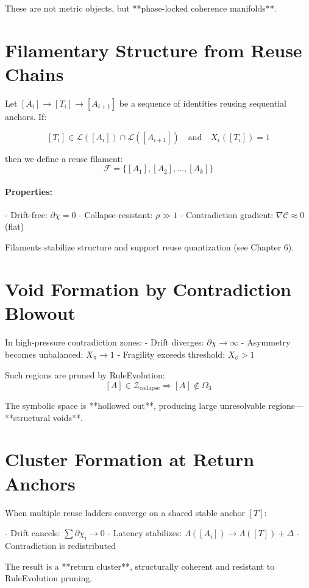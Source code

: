 These are not metric objects, but **phase-locked coherence manifolds**.

\section{Filamentary Structure from Reuse Chains}

Let $[A_i] \to [T_i] \to [A_{i+1}]$ be a sequence of identities reusing sequential anchors. If:

\[
[T_i] \in \mathcal{L}([A_i]) \cap \mathcal{L}([A_{i+1}])
\quad \text{and} \quad X_\epsilon([T_i]) = 1
\]

then we define a reuse filament:
\[
\mathcal{F} = \{[A_1], [A_2], \dots, [A_k]\}
\]

\paragraph{Properties:}
- Drift-free: $\partial \chi = 0$
- Collapse-resistant: $\rho \gg 1$
- Contradiction gradient: $\nabla \mathcal{C} \approx 0$ (flat)

Filaments stabilize structure and support reuse quantization (see Chapter 6).

\section{Void Formation by Contradiction Blowout}

In high-pressure contradiction zones:
- Drift diverges: $\partial \chi \to \infty$
- Asymmetry becomes unbalanced: $X_\pi \to 1$
- Fragility exceeds threshold: $X_\phi > 1$

Such regions are pruned by RuleEvolution:
\[
[A] \in \mathcal{Z}_{\text{collapse}} \Rightarrow [A] \notin \Omega_3
\]

The symbolic space is **hollowed out**, producing large unresolvable regions—**structural voids**.

\section{Cluster Formation at Return Anchors}

When multiple reuse ladders converge on a shared stable anchor $[T]$:

- Drift cancels: $\sum \partial \chi_i \to 0$
- Latency stabilizes: $\Lambda([A_i]) \to \Lambda([T]) + \Delta$
- Contradiction is redistributed

The result is a **return cluster**, structurally coherent and resistant to RuleEvolution pruning.

